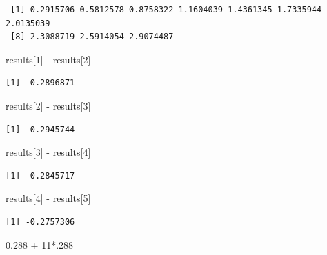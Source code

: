 \documentclass[
  letterpaper,
  DIV=11,
  numbers=noendperiod]{scrartcl}
\newenvironment{Shaded}{\begin{snugshade}}{\end{snugshade}}
\newcommand{\DecValTok}[1]{\textcolor[rgb]{0.68,0.00,0.00}{#1}}
\newcommand{\FloatTok}[1]{\textcolor[rgb]{0.68,0.00,0.00}{#1}}
\newcommand{\NormalTok}[1]{\textcolor[rgb]{0.00,0.23,0.31}{#1}}
\newcommand{\SpecialCharTok}[1]{\textcolor[rgb]{0.37,0.37,0.37}{#1}}
\begin{document}
\begin{verbatim}
 [1] 0.2915706 0.5812578 0.8758322 1.1604039 1.4361345 1.7335944 2.0135039
 [8] 2.3088719 2.5914054 2.9074487
\end{verbatim}

\begin{Shaded}
\begin{Highlighting}[]
\NormalTok{results[}\DecValTok{1}\NormalTok{] }\SpecialCharTok{{-}}\NormalTok{ results[}\DecValTok{2}\NormalTok{]}
\end{Highlighting}
\end{Shaded}

\begin{verbatim}
[1] -0.2896871
\end{verbatim}

\begin{Shaded}
\begin{Highlighting}[]
\NormalTok{results[}\DecValTok{2}\NormalTok{] }\SpecialCharTok{{-}}\NormalTok{ results[}\DecValTok{3}\NormalTok{]}
\end{Highlighting}
\end{Shaded}

\begin{verbatim}
[1] -0.2945744
\end{verbatim}

\begin{Shaded}
\begin{Highlighting}[]
\NormalTok{results[}\DecValTok{3}\NormalTok{] }\SpecialCharTok{{-}}\NormalTok{ results[}\DecValTok{4}\NormalTok{]}
\end{Highlighting}
\end{Shaded}

\begin{verbatim}
[1] -0.2845717
\end{verbatim}

\begin{Shaded}
\begin{Highlighting}[]
\NormalTok{results[}\DecValTok{4}\NormalTok{] }\SpecialCharTok{{-}}\NormalTok{ results[}\DecValTok{5}\NormalTok{]}
\end{Highlighting}
\end{Shaded}

\begin{verbatim}
[1] -0.2757306
\end{verbatim}

\begin{Shaded}
\begin{Highlighting}[]
\FloatTok{0.288} \SpecialCharTok{+} \DecValTok{11}\SpecialCharTok{*}\NormalTok{.}\DecValTok{288}
\end{Highlighting}
\end{Shaded}
\end{document}
